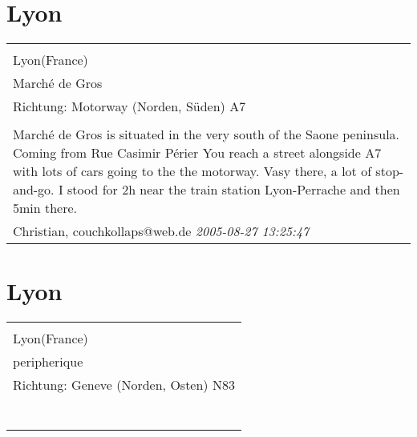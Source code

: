 \documentclass[a4paper,12pt]{article}
\begin{document}
\section{Lyon}
\begin{tabular}{|p{13cm}|}
\hline\\
Lyon(France)\\
Marché de Gros\\
Richtung: Motorway (Norden, Süden) A7 \\
\hline\\
Marché de Gros is situated in the very south of the Saone peninsula. Coming from Rue Casimir Périer You reach a street alongside A7 with lots of cars going to the the motorway. Vasy there, a lot of stop-and-go. I stood for 2h near the train station Lyon-Perrache and then 5min there. \\
Christian, couchkollaps@web.de \textit{ 2005-08-27 13:25:47 }\\\hline
\end{tabular}


\section{Lyon}
\begin{tabular}{|p{13cm}|}
\hline\\
Lyon(France)\\
peripherique\\
Richtung: Geneve (Norden, Osten) N83 \\
\hline\\
\\\
\end{tabular}
\end{document}
